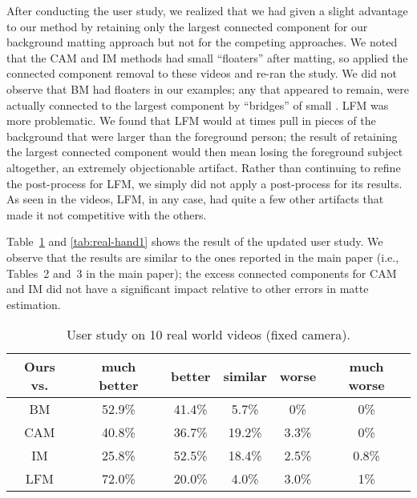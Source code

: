 \documentclass[10pt,twocolumn,letterpaper]{article}
\begin{document}
After conducting the user study, we realized that we had given a slight advantage to our method by retaining only the largest  connected component for our background matting approach but not for the competing approaches.  We noted that the CAM and IM methods had small ``floaters'' after matting, so applied the connected component removal to these videos and re-ran the study.  We did not observe that BM had floaters in our examples; any that appeared to remain, were actually connected to the largest component by ``bridges'' of small .  LFM was more problematic. We found that LFM would at times pull in pieces of the background that were larger than the foreground person; the result of retaining the largest connected component would then mean losing the foreground subject altogether, an extremely objectionable artifact.  Rather than continuing to refine the post-process for LFM, we simply did not apply a post-process for its results.  As seen in the videos, LFM, in any case, had quite a few other artifacts that made it not competitive with the others.

Table~\ref{tab:real-fixed1} and \ref{tab:real-hand1} shows the result of the updated user study. We observe that the results are similar to the ones reported in the main paper (i.e., Tables~2 and~3 in the main paper); the excess connected components for CAM and IM did not have a significant impact relative to other errors in matte estimation. 



\begin{table}[!h]
\setlength\tabcolsep{2pt}
	\centering
\small
	\captionsetup{justification=centering}
\begin{tabular}{c|ccccc}
			\toprule
			 Ours vs. &  much better & better & similar & worse & much worse \\ 
			 \midrule
			 BM & 52.9\% & 41.4\% & 5.7\% & 0\% & 0\%\\
			 CAM & 40.8\% & 36.7\% & 19.2\% & 3.3\% & 0\%\\
			 IM & 25.8\% & 52.5\% & 18.4\% & 2.5\% & 0.8\%\\
			 LFM & 72.0\% & 20.0\% & 4.0\% & 3.0\% & 1\%\\
			\bottomrule
		\end{tabular}
		\vspace{0.5em}
		\caption{\small User study on 10 real world videos (fixed camera).}
	\vspace{-.5em}
	\label{tab:real-fixed1}
\end{table}
\end{document}
